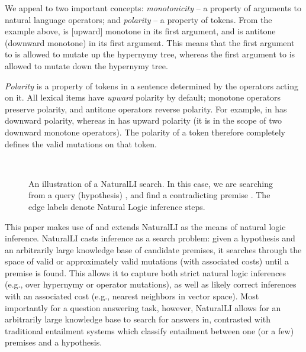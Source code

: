 We appeal to two important concepts: \textit{monotonicity} -- a
  property of arguments to natural language operators;
  and \textit{polarity} -- a property of tokens.
From the example above,  is [upward] monotone in its first
  argument, and  is antitone (downward monotone) in its first argument.
This means that the first argument to  is allowed to mutate up the
  hypernymy tree, whereas the first argument to  is allowed to mutate
  down the hypernymy tree.

\textit{Polarity} is
  a property of tokens in a sentence determined by the
  operators acting on it.
All lexical items have \textit{upward} polarity by default;
  monotone operators preserve polarity,
  and antitone operators reverse polarity.
For example,  in  has downward 
  polarity, whereas  in 
  has upward polarity
  (it is in the scope of two downward monotone operators).
The polarity of a token therefore completely defines the valid mutations
  on that token.

%
%

\begin{figure}[t]
\begin{center}
  \resizebox{0.48\textwidth}{!}{\teaserSearch} \\
\end{center}
\caption{
  An illustration of a NaturalLI search.
  In this case, we are searching from a query (hypothesis)
  , and find a contradicting
  premise .
  The edge labels denote Natural Logic inference steps.
  \label{fig:naturalli}
}
\end{figure}

This paper makes use of and extends NaturalLI \cite{key:2014angeli-naturalli}
  as the means of natural logic inference.
NaturalLI casts inference as a search problem: given a hypothesis and an arbitrarily
  large knowledge base of candidate premises, it searches through the space of valid
  or approximately valid mutations (with associated costs) until a premise is
  found.
This allows it to capture both strict natural logic inferences (e.g., over hypernymy
  or operator mutations), as well as likely correct inferences with an associated
  cost (e.g., nearest neighbors in vector space).
Most importantly for a question answering task, however, NaturalLI allows for an
  arbitrarily large knowledge base to search for answers in, contrasted with traditional
  entailment systems which classify entailment between one (or a few) premises and a
  hypothesis.

